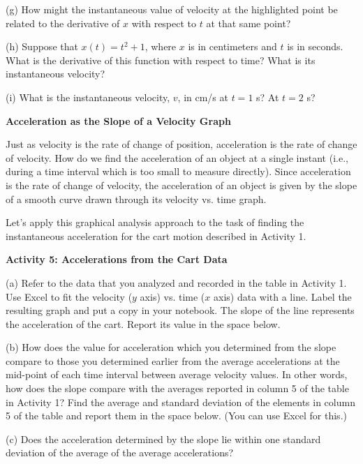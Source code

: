 (g) How might the instantaneous value of velocity at the highlighted point be
related to the derivative of $x$ with respect to $t$ at that same point?
\vspace{20mm}

(h) Suppose that $x(t) = t^{2} + 1$, where $x$ is in centimeters and $t$ is
in seconds. What is the derivative of this function with respect to time? What
is its instantaneous velocity?
\vspace{20mm}

(i) What is the instantaneous velocity, $v$, in cm/s at $t = 1$ s? At 
$t = 2$ s?
\vspace{20mm}

\textbf{Acceleration as the Slope of a Velocity Graph} 

Just as velocity is the rate of change of position, acceleration is the rate
of change of velocity. How do we find the acceleration of an object at a single
instant (i.e., during a time interval which is too small to measure directly).
Since acceleration is the rate of change of velocity, the acceleration of an
object is given by the slope of a smooth curve drawn through its velocity vs.
time graph.

Let's apply this graphical analysis approach to the task of finding the instantaneous
acceleration for the cart motion described in Activity 1.

\textbf{Activity 5: Accelerations from the Cart Data }

(a) Refer to the data that you analyzed and recorded in the table in Activity
1. Use Excel to fit the velocity ($y$ axis) vs. time ($x$ axis) data with
a line. Label the resulting graph and put a copy in your notebook. The slope
of the line represents the acceleration of the cart. Report its value in the
space below.
\vspace{10mm}

(b) How does the value for acceleration which you determined from the slope
compare to those you determined earlier from the average accelerations at the
mid-point of each time interval between average velocity values. In other words,
how does the slope compare with the averages reported in column 5 of the table
in Activity 1? Find the average and standard deviation of the elements in column
5 of the table and report them in the space below. (You can use Excel
for this.)
\vspace{20mm}

(c) Does the acceleration determined by the slope lie within one standard deviation
of the average of the average accelerations? 

